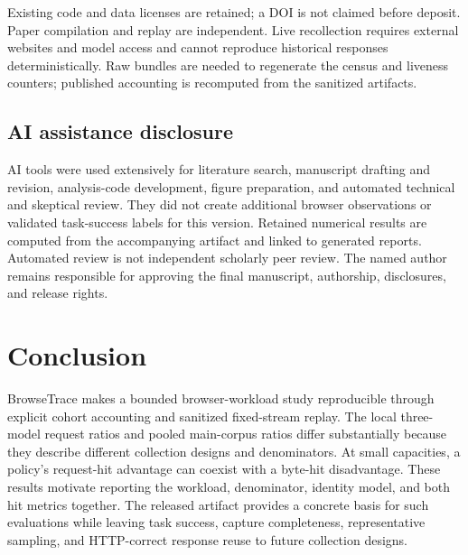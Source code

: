 \documentclass[10pt,sigconf,nonacm]{acmart}
\newcommand{\sysname}{BrowseTrace\xspace}
\begin{document}
Existing code and data licenses are retained; a DOI is not claimed before deposit. Paper compilation and replay are independent. Live recollection requires external websites and model access and cannot reproduce historical responses deterministically. Raw bundles are needed to regenerate the census and liveness counters; published accounting is recomputed from the sanitized artifacts.

\subsection{AI assistance disclosure}
AI tools were used extensively for literature search, manuscript drafting and revision, analysis-code development, figure preparation, and automated technical and skeptical review. They did not create additional browser observations or validated task-success labels for this version. Retained numerical results are computed from the accompanying artifact and linked to generated reports. Automated review is not independent scholarly peer review. The named author remains responsible for approving the final manuscript, authorship, disclosures, and release rights.

\section{Conclusion}
\sysname makes a bounded browser-workload study reproducible through explicit cohort accounting and sanitized fixed-stream replay. The local three-model request ratios and pooled main-corpus ratios differ substantially because they describe different collection designs and denominators. At small capacities, a policy's request-hit advantage can coexist with a byte-hit disadvantage. These results motivate reporting the workload, denominator, identity model, and both hit metrics together. The released artifact provides a concrete basis for such evaluations while leaving task success, capture completeness, representative sampling, and HTTP-correct response reuse to future collection designs.

\label{sec:body-end}


\end{document}
